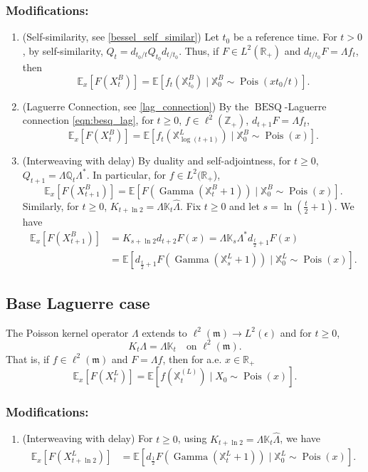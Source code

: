 \documentclass[11pt,a4,reqno]{amsart}
\numberwithin{equation}{section}
\theoremstyle{definition}
\theoremstyle{remark}
\newcommand{\bb}[1]{\mathbb{#1}}
\newcommand{\frk}[1]{\mathfrak{#1}}
\newcommand{\E}{\bb{E}}
\newcommand{\R}{\bb{R}}
\newcommand{\Z}{\bb{Z}}
\DeclareMathOperator{\besq}{BESQ}
\DeclareMathOperator{\pois}{Pois}
\DeclareMathOperator{\Gam}{Gamma}
\newcommand{\beq}{\begin{equation}}
\newcommand{\eeq}{\end{equation}}
\begin{document}
\subsubsection{Modifications:}
	\begin{enumerate}
	
		\item (Self-similarity, see \ref{bessel_self_similar}) Let $t_0$ be a reference time. For $t > 0$, by self-similarity, $Q_t = d_{t_0/t} Q_{t_0} d_{t/t_0}$. Thus, if $F \in L^2(\R_+)$ and $d_{t/t_0} F = \Lambda f_t$, then
			\beq \E_x[F(X_t^B)] = \E[f_t(\bb{X}^B_{t_0}) \mid \bb{X}^B_0 \sim \pois(xt_0/t)] . \eeq
			
		\item (Laguerre Connection, see \ref{lag_connection}) By the $\besq$-Laguerre connection \eqref{eqn:besq_lag}, for $t \geq  0$, $f \in \ell^2(\Z_+)$, $d_{t + 1}F = \Lambda f_t$,
			\beq \E_x[F(X_t^{B})] = \E[f_t(\bb{X}^{L}_{\log (t + 1)}) \mid \bb{X}^B_0 \sim \pois(x)] . \eeq
			
		\item (Interweaving with delay) By duality and self-adjointness, for $t \geq 0$,  $Q_{t + 1} = \Lambda \bb{Q}_t \Lambda^*$. In particular, for $f \in L^2(\R_+$), 
			\beq \E_x[F(X_{t + 1}^{B})] = \E[F(\Gam(\bb{X}_t^{B} + 1)) \mid \bb{X}^B_0 \sim \pois(x)] . \eeq
			Similarly, for $t \geq 0$, $K_{t + \ln 2} = \Lambda \bb{K}_t \widehat{\Lambda}$. Fix $t \geq 0$ and let $s = \ln (\frac{t}{2} + 1)$. We have
			\begin{align}
			 \E_x[F(X_{t + 1}^{B})] &= K_{s + \ln 2} d_{t+2} F (x) = \Lambda \bb{K}_s \Lambda^* d_{\frac{t}{2} + 1} F(x) \\
			 &= \E[d_{\frac{t}{2} + 1} F(\Gam(\bb{X}_s^{L} + 1)) \mid \bb{X}^L_0 \sim \pois(x)].
			\end{align}
	
	\end{enumerate}
	
\subsection{Base Laguerre case} 
	The Poisson kernel operator $\Lambda$ extends to $\ell^2(\frk{m}) \to L^2(\epsilon)$ and for $t \geq 0$, 
	\beq K_t\Lambda = \Lambda \bb{K}_t \quad \text{on } \ell^2(\frk{m}). \eeq
	That is, if $f \in \ell^2(\frk{m})$ and $F = \Lambda f$, then for a.e. $x \in \R_+$
	\beq \E_x[F(X_t^{L})] = \E[f(\bb{X}_t^{(L)}) \mid X_0 \sim \pois(x)] . \eeq

\subsubsection{Modifications:}
	\begin{enumerate}
	\item (Interweaving with delay) For $t \geq 0$, using $K_{t + \ln 2} = \Lambda \bb{K}_t \widehat{\Lambda}$, we have
			\begin{align}
			 \E_x[F(X_{t + \ln 2}^{L})] &= \E[d_{\frac{1}{2}} F(\Gam(\bb{X}_t^{L} + 1)) \mid \bb{X}^L_0 \sim \pois(x)].
			\end{align}
	
	\end{enumerate}
	
\end{document}
